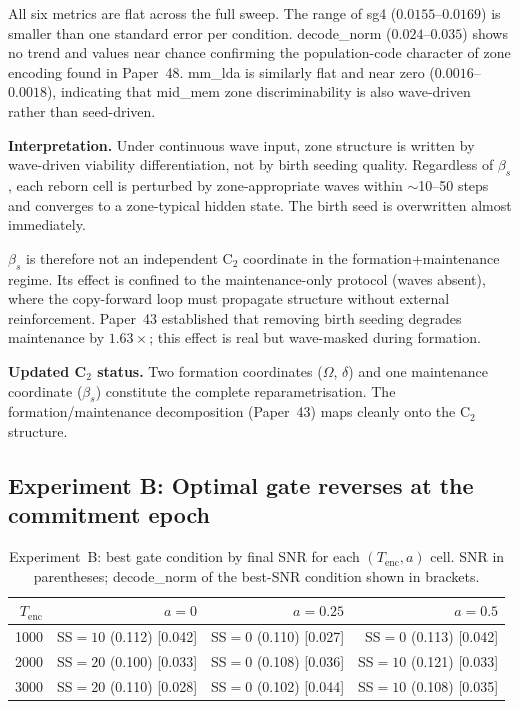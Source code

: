 \documentclass[11pt,a4paper]{article}
\begin{document}
All six metrics are flat across the full sweep.
The range of sg4 ($0.0155$--$0.0169$) is smaller than one standard error per condition.
decode\_norm ($0.024$--$0.035$) shows no trend and values near chance confirming
the population-code character of zone encoding found in Paper~48.
mm\_lda is similarly flat and near zero ($0.0016$--$0.0018$),
indicating that mid\_mem zone discriminability is also wave-driven rather than seed-driven.

\textbf{Interpretation.}
Under continuous wave input, zone structure is written by wave-driven viability
differentiation, not by birth seeding quality.
Regardless of $\beta_s$, each reborn cell is perturbed by zone-appropriate waves
within $\sim$10--50 steps and converges to a zone-typical hidden state.
The birth seed is overwritten almost immediately.

$\beta_s$ is therefore not an independent C$_2$ coordinate in the formation+maintenance
regime.
Its effect is confined to the maintenance-only protocol (waves absent), where the
copy-forward loop must propagate structure without external reinforcement.
Paper~43 established that removing birth seeding degrades maintenance by $1.63\times$;
this effect is real but wave-masked during formation.

\textbf{Updated C$_2$ status.}
Two formation coordinates ($\Omega$, $\delta$) and one maintenance coordinate ($\beta_s$)
constitute the complete reparametrisation.
The formation/maintenance decomposition (Paper~43) maps cleanly onto the C$_2$ structure.

\subsection{Experiment B: Optimal gate reverses at the commitment epoch}

\begin{table}[h]
\centering
\caption{Experiment~B: best gate condition by final SNR for each $(T_\mathrm{enc}, a)$ cell.
SNR in parentheses; decode\_norm of the best-SNR condition shown in brackets.}
\label{tab:expb}
\begin{tabular}{rrrr}
\toprule
$T_\mathrm{enc}$ & $a=0$ & $a=0.25$ & $a=0.5$ \\
\midrule
1000 & SS$=10$ (0.112) [0.042] & SS$=0$  (0.110) [0.027] & SS$=0$  (0.113) [0.042] \\
2000 & SS$=20$ (0.100) [0.033] & SS$=0$  (0.108) [0.036] & SS$=10$ (0.121) [0.033] \\
3000 & SS$=20$ (0.110) [0.028] & SS$=0$  (0.102) [0.044] & SS$=10$ (0.108) [0.035] \\
\bottomrule
\end{tabular}
\end{table}
\end{document}
